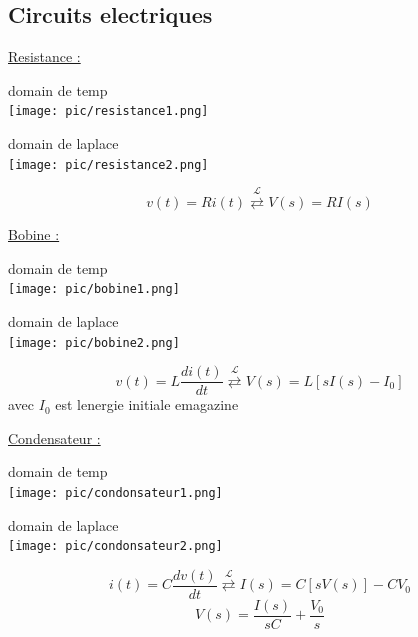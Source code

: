 \documentclass[12pt]{book}
\newcommand{\lagrange}{\mathcal{L}}
\begin{document}
            \subsection{Circuits electriques}
                \underline{Resistance :}
                \begin{center}
                    \begin{minipage}{0,49\linewidth}
                        domain de temp \\
                        \texttt{[image: pic/resistance1.png]}
                    \end{minipage}
                    \begin{minipage}{0,49\linewidth}
                        domain de laplace \\
                        \texttt{[image: pic/resistance2.png]}
                    \end{minipage}
                    $$ v(t) = Ri(t) \overset{\lagrange}{\rightleftarrows}V(s)=RI(s) $$
                \end{center} 
                \pagebreak
                \underline{Bobine :}
                \begin{center}
                    \begin{minipage}{0,49\linewidth}
                        domain de temp \\
                        \texttt{[image: pic/bobine1.png]}
                    \end{minipage}
                    \begin{minipage}{0,49\linewidth}
                        domain de laplace \\
                        \texttt{[image: pic/bobine2.png]}
                    \end{minipage}
                    $$ v(t) = L\frac{di(t)}{dt} \overset{\lagrange}{\rightleftarrows}V(s)=L[sI(s) - I_0] $$ 
                    avec $I_0$ est lenergie initiale emagazine
                \end{center} 
                \underline{Condensateur :}
                \begin{center}
                    \begin{minipage}{0,49\linewidth}
                        domain de temp \\
                        \texttt{[image: pic/condonsateur1.png]}
                    \end{minipage}
                    \begin{minipage}{0,49\linewidth}
                        domain de laplace \\
                        \texttt{[image: pic/condonsateur2.png]}
                    \end{minipage}
                    $$ i(t)=C\frac{dv(t)}{dt} \overset{\lagrange}{\rightleftarrows}I(s) = C[sV(s)] -CV_0 $$ 
                    $$ V(s) = \frac{I(s)}{sC}+\frac{V_0}{s} $$
                \end{center} 
\end{document}
